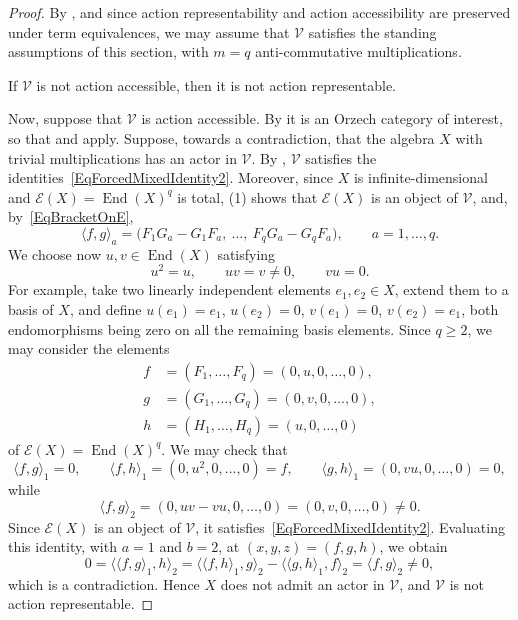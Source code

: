 \documentclass[reqno,a4paper]{amsart}
\theoremstyle{plain}
\theoremstyle{definition}
\theoremstyle{remark}
\numberwithin{equation}{section}
\newcommand{\E}{\mathcal{E}}
\newcommand{\V}{\mathcal{V}}
\DeclareMathOperator{\End}{End}
\begin{document}
\begin{proof}
By , and since action representability and action accessibility are preserved under term equivalences, we may assume that $\V$ satisfies the standing assumptions of this section, with $m=q$ anti-commutative multiplications.

If $\V$ is not action accessible, then it is not action representable.

Now, suppose that $\V$ is action accessible. By  it is an Orzech category of interest, so that  and  apply. Suppose, towards a contradiction, that the algebra $X$ with trivial multiplications has an actor in $\V$. By , $\V$ satisfies the identities~\eqref{EqForcedMixedIdentity2}. Moreover, since $X$ is infinite-dimensional and $\E(X)=\End(X)^q$ is total, (1) shows that $\E(X)$ is an object of $\V$, and, by~\eqref{EqBracketOnE},
\[
\langle f,g\rangle_a
=
\bigl(F_1G_a-G_1F_a,\ \ldots,\ F_qG_a-G_qF_a\bigr),
\qquad
a=1,\ldots,q .
\]
We choose now $u,v\in\End(X)$ satisfying
\[
u^2=u,\qquad uv=v\neq0,\qquad vu=0 .
\]
For example, take two linearly independent elements $e_1,e_2\in X$, extend them to a basis of $X$, and define $u(e_1)=e_1$, $u(e_2)=0$, $v(e_1)=0$, $v(e_2)=e_1$, both endomorphisms being zero on all the remaining basis elements. Since $q\geq2$, we may consider the elements
\begin{align*}
f&=(F_1,\ldots,F_q)=(0,u,0,\ldots,0),\\
g&=(G_1,\ldots,G_q)=(0,v,0,\ldots,0),\\
h&=(H_1,\ldots,H_q)=(u,0,\ldots,0)
\end{align*}
of $\E(X)=\End(X)^q$. We may check that
\[
\langle f,g\rangle_1=0,
\qquad
\langle f,h\rangle_1=(0,u^2,0,\ldots,0)=f,
\qquad
\langle g,h\rangle_1=(0,vu,0,\ldots,0)=0,
\]
while
\[
\langle f,g\rangle_2=(0,uv-vu,0,\ldots,0)=(0,v,0,\ldots,0)\neq0 .
\]
Since $\E(X)$ is an object of $\V$, it satisfies~\eqref{EqForcedMixedIdentity2}. Evaluating this identity, with $a=1$ and $b=2$, at $(x,y,z)=(f,g,h)$, we obtain
\[
0
=
\bigl\langle\langle f,g\rangle_1,h\bigr\rangle_2
=
\bigl\langle\langle f,h\rangle_1,g\bigr\rangle_2
-
\bigl\langle\langle g,h\rangle_1,f\bigr\rangle_2
=
\langle f,g\rangle_2\neq0,
\]
which is a contradiction. Hence $X$ does not admit an actor in $\V$, and $\V$ is not action representable.
\end{proof}
\end{document}
